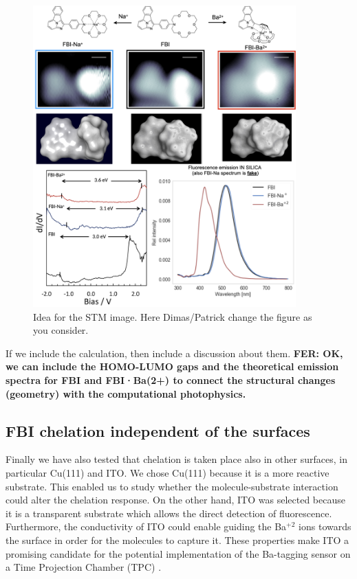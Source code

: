 \documentclass[aps,prl,reprint,longbibliography,superscriptaddress]{revtex4-1}
\def\Ba{Ba$^{+2}$ }
\newcommand{\completar}[1]{{\color{red} #1}}
\begin{document}
\begin{figure}[ht!]
	\includegraphics[width=0.9\textwidth]{figures/fig4_stm_chelation.png}
	\caption{\label{STM_chelation} 
    Idea for the STM image. Here Dimas/Patrick change the figure as you consider. }
\end{figure}  

\completar{If we include the calculation, then include a discussion about them.\textbf{ FER: OK, we can include the HOMO-LUMO gaps and the theoretical emission spectra for FBI and FBI·Ba(2+) to connect the structural changes (geometry) with the computational photophysics.}}



\subsection{FBI chelation independent of the surfaces}

Finally we have also tested that chelation is taken place also in other surfaces, in particular Cu(111) and ITO. We chose Cu(111) because it is a more reactive substrate. This enabled us to study whether the molecule-substrate interaction could alter the chelation response. On the other hand, ITO was selected because it is a transparent substrate which allows the direct detection of fluorescence. \completar{Furthermore, the conductivity of ITO could enable guiding the \Ba ions towards the surface in order for the molecules to capture it. These properties make ITO a promising candidate for the potential implementation of the Ba-tagging sensor on a Time Projection Chamber (TPC) \cite{rivilla_fluorescent_2020}}.
\end{document}

